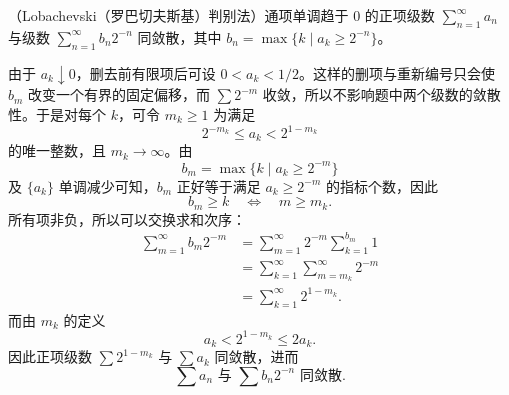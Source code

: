 \begin{xreferenceproblem}[7]
（Lobachevski（罗巴切夫斯基）判别法）通项单调趋于 0 的正项级数 $\sum_{n=1}^{\infty}a_n$ 与级数 $\sum_{n=1}^{\infty}b_n2^{-n}$ 同敛散，其中 $b_n=\max\{k\mid a_k\geq2^{-n}\}$。
\end{xreferenceproblem}
\begin{xsolution}
由于 $a_k\downarrow0$，删去前有限项后可设 $0<a_k<1/2$。这样的删项与重新编号只会使 $b_m$ 改变一个有界的固定偏移，而 $\sum2^{-m}$ 收敛，所以不影响题中两个级数的敛散性。于是对每个 $k$，可令 $m_k\geq1$ 为满足
\[
 2^{-m_k}\leq a_k<2^{1-m_k}
\]
的唯一整数，且 $m_k\to\infty$。由
\[
 b_m=\max\{k\mid a_k\geq2^{-m}\}
\]
及 $\{a_k\}$ 单调减少可知，$b_m$ 正好等于满足 $a_k\geq2^{-m}$ 的指标个数，因此
\[
 b_m\geq k\quad\Longleftrightarrow\quad m\geq m_k.
\]
所有项非负，所以可以交换求和次序：
\[
 \begin{aligned}
 \sum_{m=1}^{\infty}b_m2^{-m}
 &=\sum_{m=1}^{\infty}2^{-m}\sum_{k=1}^{b_m}1\\
 &=\sum_{k=1}^{\infty}\sum_{m=m_k}^{\infty}2^{-m}\\
 &=\sum_{k=1}^{\infty}2^{1-m_k}.
 \end{aligned}
\]
而由 $m_k$ 的定义
\[
 a_k<2^{1-m_k}\leq2a_k.
\]
因此正项级数 $\sum2^{1-m_k}$ 与 $\sum a_k$ 同敛散，进而
\[
 \boxed{\sum a_n\text{ 与 }\sum b_n2^{-n}\text{ 同敛散}.}
\]
\end{xsolution}


